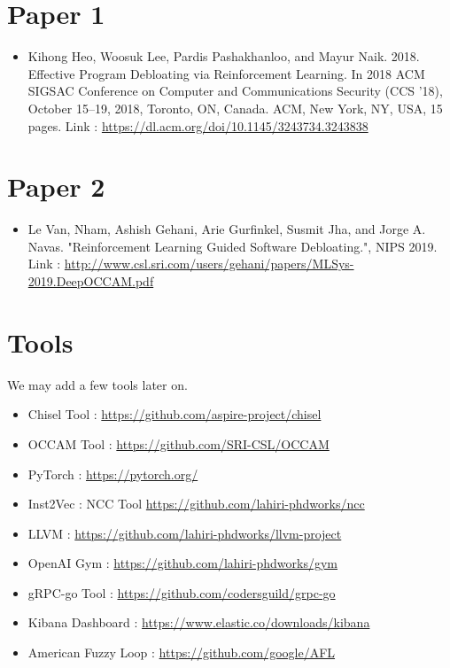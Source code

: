\documentclass{article} %
\begin{document}
\section*{Paper 1} \label{second}
\begin{itemize}
    \item \color{blue} Kihong Heo, Woosuk Lee, Pardis Pashakhanloo, and Mayur Naik. 2018.
    Effective Program Debloating via Reinforcement Learning. In 2018 ACM
    SIGSAC Conference on Computer and Communications Security (CCS ’18), October
    15–19, 2018, Toronto, ON, Canada. ACM, New York, NY, USA, 15 pages. \color{black} Link :
    \url{https://dl.acm.org/doi/10.1145/3243734.3243838}
\end{itemize}

\section*{Paper 2}
\begin{itemize}
    \item \color{blue} Le Van, Nham, Ashish Gehani, Arie Gurfinkel, Susmit Jha, and Jorge A. Navas. "Reinforcement Learning Guided Software Debloating.", NIPS 2019. \color{black} Link : \url{http://www.csl.sri.com/users/gehani/papers/MLSys-2019.DeepOCCAM.pdf} 
\end{itemize}

\section*{Tools}
We may add a few tools later on.
\begin{itemize}
    \item Chisel Tool : \url{https://github.com/aspire-project/chisel}
    \item OCCAM Tool : \url{https://github.com/SRI-CSL/OCCAM}
    \item PyTorch : \url{https://pytorch.org/}
    \item Inst2Vec : NCC Tool \url{https://github.com/lahiri-phdworks/ncc}
    \item LLVM : \url{https://github.com/lahiri-phdworks/llvm-project}
    \item OpenAI Gym : \url{https://github.com/lahiri-phdworks/gym}
    \item gRPC-go Tool : \url{https://github.com/codersguild/grpc-go}
    \item Kibana Dashboard : \url{https://www.elastic.co/downloads/kibana}
    \item American Fuzzy Loop : \url{https://github.com/google/AFL}
\end{itemize}
\end{document}
